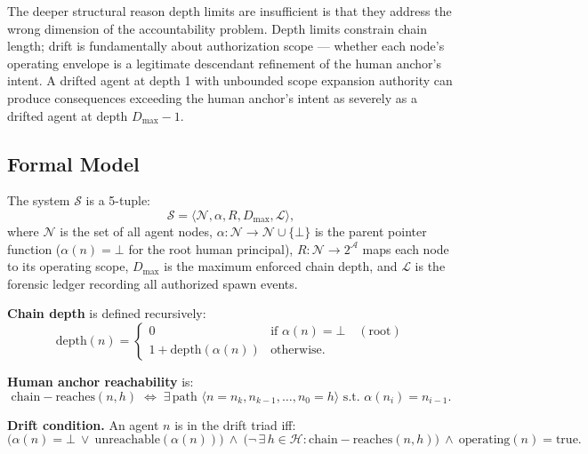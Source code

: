 The deeper structural reason depth limits are insufficient is that they address the wrong dimension of the accountability problem. Depth limits constrain chain length; drift is fundamentally about authorization scope — whether each node's operating envelope is a legitimate descendant refinement of the human anchor's intent. A drifted agent at depth 1 with unbounded scope expansion authority can produce consequences exceeding the human anchor's intent as severely as a drifted agent at depth $D_{\max} - 1$.

\subsection{Formal Model}
\label{sec:drift-model}

The system $\mathcal{S}$ is a 5-tuple:
\begin{equation}
\mathcal{S} = \langle \mathcal{N}, \alpha, R, D_{\max}, \mathcal{L} \rangle,
\label{eq:system-model}
\end{equation}
where $\mathcal{N}$ is the set of all agent nodes, $\alpha: \mathcal{N} \rightarrow \mathcal{N} \cup \{\bot\}$ is the parent pointer function ($\alpha(n) = \bot$ for the root human principal), $R: \mathcal{N} \rightarrow 2^{\mathcal{A}}$ maps each node to its operating scope, $D_{\max}$ is the maximum enforced chain depth, and $\mathcal{L}$ is the forensic ledger recording all authorized spawn events.

\medskip
\noindent\textbf{Chain depth} is defined recursively:
\begin{equation}
\mathrm{depth}(n) = 
\begin{cases}
0 & \text{if } \alpha(n) = \bot \quad (\text{root}) \\
1 + \mathrm{depth}(\alpha(n)) & \text{otherwise}.
\end{cases}
\label{eq:depth}
\end{equation}

\medskip
\noindent\textbf{Human anchor reachability} is:
\begin{equation}
\mathrm{chain-reaches}(n, h) \;\iff\; \exists\, \text{path } \langle n = n_k, n_{k-1}, \ldots, n_0 = h \rangle \text{ s.t. } \alpha(n_i) = n_{i-1}.
\label{eq:chain-reaches}
\end{equation}

\medskip
\noindent\textbf{Drift condition.} An agent $n$ is in the drift triad iff:
\begin{equation}
\bigl( \alpha(n) = \bot \ \lor \ \mathrm{unreachable}(\alpha(n)) \bigr)\ \land\ \bigl( \neg\,\exists\, h \in \mathcal{H} : \mathrm{chain-reaches}(n, h) \bigr)\ \land\ \mathrm{operating}(n) = \mathrm{true}.
\label{eq:drift-condition}
\end{equation}

